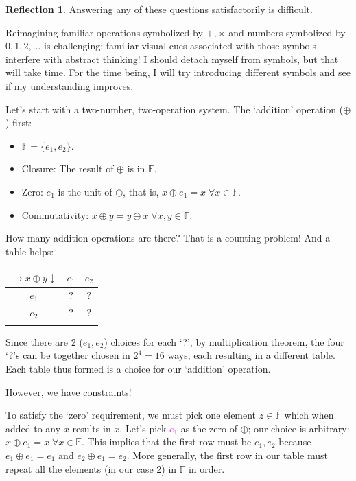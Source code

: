 \documentclass[english,notitlepage,smartquotes]{hgbreport}
\theoremstyle{definition}
\theoremstyle{definition}
\theoremstyle{remark}
\theoremstyle{definition}
\theoremstyle{plain}
\theoremstyle{definition}
\newtheorem{reflection}{Reflection}
\begin{document}
\begin{reflection}
Answering any of these questions satisfactorily is difficult.

Reimagining familiar operations symbolized by $+,\times$ and numbers symbolized by $0,1,2,\dots$ is challenging; familiar visual cues associated with those symbols interfere with abstract thinking! I should detach myself from symbols, but that will take time. For the time being, I will try introducing different symbols and see if my understanding improves.

Let's start with a two-number, two-operation system. The `addition' operation ($\oplus$) first:

\begin{itemize}
\item $\mathbb{F}=\{e_1,e_2\}$.
\item Closure: The result of $\oplus$ is in $\mathbb{F}$.
\item Zero: $e_1$ is the unit of $\oplus$, that is, $x\oplus e_1=x\;\forall x\in\mathbb{F}$.
\item Commutativity: $x\oplus y=y\oplus x\;\forall x,y\in\mathbb{F}$.
\end{itemize}

How many addition operations are there? That is a counting problem! And a table helps:

\begin{tabular}{c|cc}
$\rightarrow x\oplus y\downarrow$ & $e_1$ & $e_2$\\
\hline
$e_1$ & $?$ & $?$\\
$e_2$ & $?$ & $?$\\
\label{tab:abstractadd2}
\end{tabular}

Since there are 2 ($e_1, e_2$) choices for each `?', by multiplication theorem, the four `?'s can be together chosen in $2^4=16$ ways; each resulting in a different table. Each table thus formed is a choice for our `addition' operation. 

However, we have constraints!

To satisfy the `zero' requirement, we must pick one element $z\in\mathbb{F}$ which when added to any $x$ results in $x$. Let's pick \textcolor{magenta}{$e_1$} as the zero of $\oplus$; our choice is arbitrary: $x\oplus e_1=x\;\forall x\in\mathbb{F}$. This implies that the first row must be $e_1, e_2$ because $e_1\oplus e_1=e_1$ and $e_2\oplus e_1=e_2$. More generally, the first row in our table must repeat all the elements (in our case 2) in $\mathbb{F}$ in order. 


\end{reflection}
\end{document}
